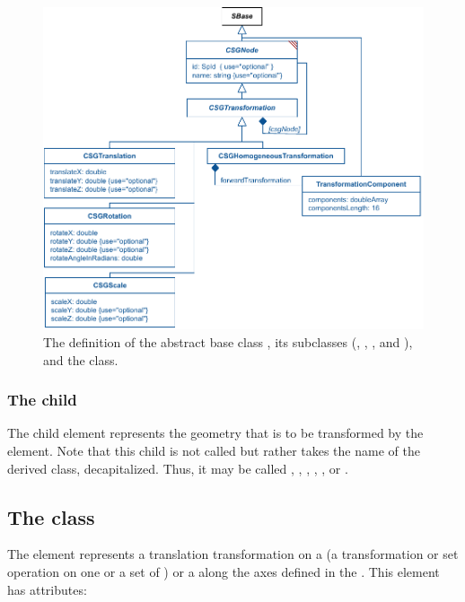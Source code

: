 \begin{figure}[ht]
  \includegraphics{figs/CSGTransformation-uml}
  \caption{The definition of the abstract base class \CSGTransformation, its subclasses (\CSGTranslation, \CSGRotation, \CSGScale, and \CSGHomogeneousTransformation), and the \TransformationComponent class.}
  \label{CSGTransformation-uml}
  \label{CSGRotation-uml}
  \label{CSGScale-uml}
  \label{CSGHomogeneousTransformation-uml}
  \label{TransformationComponent-uml}
\end{figure}

\subsubsection{The \fixttspace{} child}

The child  element represents the geometry that is to be transformed by the \CSGTransformation element.  Note that this child is not called  but rather takes the name of the derived class, decapitalized.  Thus, it may be called , , , , , or .


\subsection{The  class}
\label{csgtranslation-class}
The \CSGTranslation element represents a translation transformation on a \CSGNode (a transformation or set operation on one or a set of \CSGPrimitives) or a \CSGPrimitive along the axes defined in the \Geometry. This element has  attributes:

